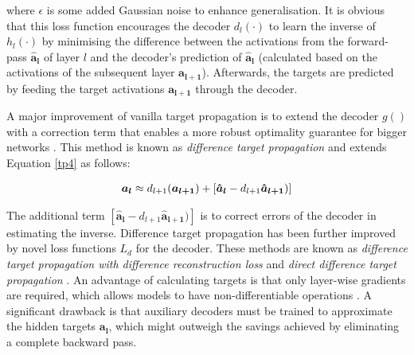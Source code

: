 where $\epsilon$ is some added Gaussian noise to enhance generalisation.
It is obvious that this loss function encourages the decoder $d_l(\cdot)$ to learn the inverse of $h_l(\cdot)$ by minimising the difference between the activations from the forward-pass $\boldsymbol{\hat{a}_l}$ of layer $l$ and the decoder's prediction of $\boldsymbol{\hat{a}_l}$ (calculated based on the activations of the subsequent layer $\boldsymbol{\hat{a}_{l+1}}$).
Afterwards, the targets are predicted by feeding the target activations $\boldsymbol{a_{l+1}}$ through the decoder.

A major improvement of vanilla target propagation is to extend the decoder $g()$ with a correction term that enables a more robust optimality guarantee for bigger networks .
This method is known as \emph{difference target propagation} and extends Equation \eqref*{tp4} as follows:

\begin{align}\eqlbl{tp6}
	\boldsymbol{a_{l}} \approx d_{l+1}(\boldsymbol{a_{l+1}}) + \left[ \boldsymbol{\hat{a}_l} - d_{l+1}\boldsymbol{\hat{a}_{l+1}}) \right]
\end{align}

The additional term $\left[ \boldsymbol{\hat{a}_l} - d_{l+1}\boldsymbol{\hat{a}_{l+1}}) \right]$ is to correct errors of the decoder in estimating the inverse.
Difference target propagation has been further improved by novel loss functions $L_{d}$ for the decoder.
These methods are known as \emph{difference target propagation with difference reconstruction loss} and \emph{direct difference target propagation} .
An advantage of calculating targets is that only layer-wise gradients are required, which allows models to have non-differentiable operations \cite{Lee_Zhang_Fischer_Bengio_2015}.
A significant drawback is that auxiliary decoders must be trained to approximate the hidden targets $\boldsymbol{a_{l}}$, which might outweigh the savings achieved by eliminating a complete backward pass.

